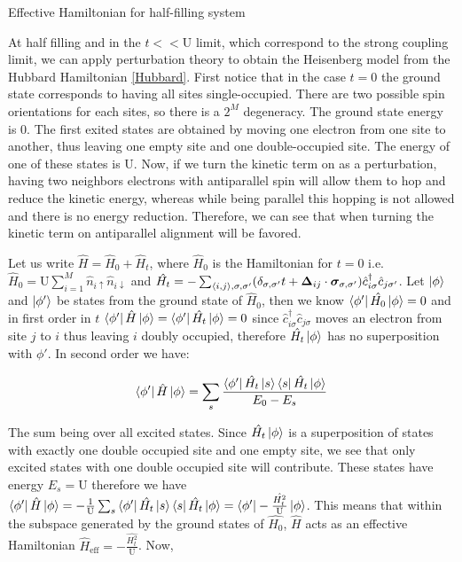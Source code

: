 \begin{section}{Effective Hamiltonian for half-filling system}

At half filling and in the $t << \text{U}$ limit, which correspond to the strong coupling limit, we can apply perturbation theory to obtain the Heisenberg model from the Hubbard Hamiltonian \ref{Hubbard}. First notice that in the case $t = 0$ the ground state corresponds to having all sites single-occupied. There are two possible spin orientations for each sites, so there is a $2^M$ degeneracy. The ground state energy is $0$. The first exited states are obtained by moving one electron from one site to another, thus leaving one empty site and one double-occupied site. The energy of one of these states is $\text{U}$. Now, if we turn the kinetic term on as a perturbation, having two neighbors electrons with antiparallel spin will allow them to hop and reduce the kinetic energy, whereas while being parallel this hopping is not allowed and there is no energy reduction. Therefore, we can see that when turning the kinetic term on antiparallel alignment will be favored. 

Let us write $\hat{H} = \hat{H}_0 + \hat{H}_t$, where $\hat{H}_0$ is the Hamiltonian for $t=0$ i.e. $\hat{H}_0 = \text{U} \sum_{i=1}^M \hat{n}_{i\uparrow}\hat{n}_{i\downarrow}$ and $\hat{H_t} = -\sum_{\langle i,j \rangle, \sigma, \sigma'}(\delta_{\sigma, \sigma'} t + \boldsymbol{\Delta}_{ij}\cdot \boldsymbol{\sigma}_{\sigma, \sigma'})\hat{c}_{i \sigma}^\dagger \hat{c}_{j \sigma'}$. Let $\ket{\phi}$ and $\ket{\phi'}$ be states from the ground state of $\hat{H}_0$, then we know $\bra{\phi'} \hat{H_0} \ket{\phi} = 0$ and in first order in $t$ $\bra{\phi'} \hat{H} \ket{\phi} = \bra{\phi'} \hat{H_t} \ket{\phi} = 0$ since $\hat{c}_{i \sigma}^\dagger \hat{c}_{j \sigma}$ moves an electron from site $j$ to $i$ thus leaving $i$ doubly occupied, therefore $\hat{H_t} \ket{\phi}$ has no superposition with $\phi'$. In second order we have:

\begin{equation}
\bra{\phi'} \hat{H} \ket{\phi} = \sum_s \frac{\bra{\phi'} \hat{H_t} \ket{s}\bra{s} \hat{H_t} \ket{\phi}}{E_0-E_s}
\end{equation}

The sum being over all excited states. Since $\hat{H_t}\ket{\phi}$ is a superposition of states with exactly one double occupied site and one empty site, we see that only excited states with one double occupied site will contribute. These states have energy $E_s = \text{U}$ therefore we have $\bra{\phi'} \hat{H} \ket{\phi} = -\frac{1}{\text{U}}\sum_s \bra{\phi'} \hat{H_t} \ket{s}\bra{s} \hat{H_t} \ket{\phi} = \bra{\phi'} -\frac{\hat{H_t^2}}{\text{U}} \ket{\phi}$. This means that within the subspace generated by the ground states of $\hat{H_0}$, $\hat{H}$ acts as an effective Hamiltonian $\hat{H}_{\text{eff}} = -\frac{\hat{H_t^2}}{\text{U}}$. Now,


\end{section}
